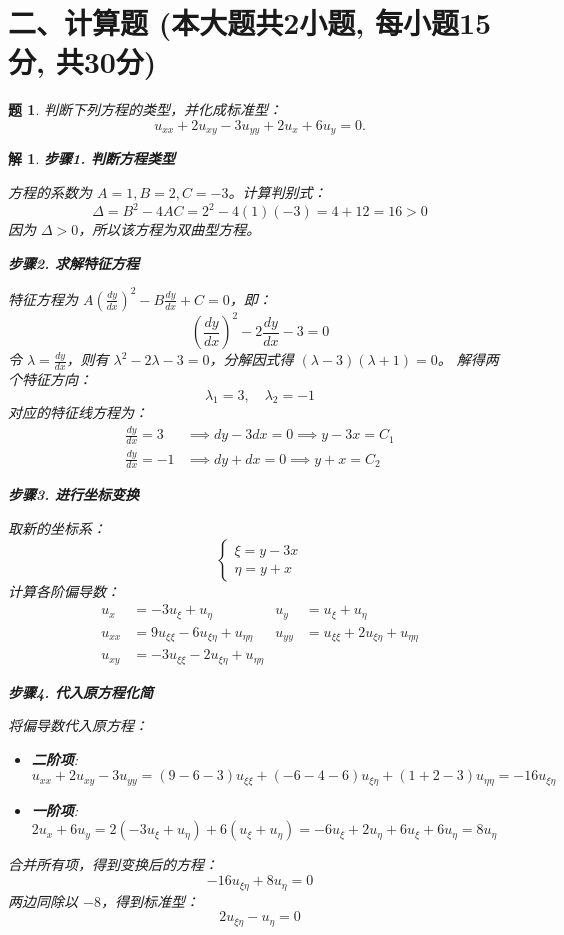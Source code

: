 \documentclass[12pt,a4paper]{article}
\newtheorem{problem}{题}
\newtheorem*{solution}{解}
\begin{document}
	\newpage
	\section*{二、计算题 (本大题共2小题, 每小题15分, 共30分)}
	
	\begin{problem}
		判断下列方程的类型，并化成标准型：
		\[
		u_{xx} + 2u_{xy} - 3u_{yy} + 2u_x + 6u_y = 0.
		\]
	\end{problem}
	\hrulefill
	\begin{solution}
		\textbf{步骤1. 判断方程类型}
		
		\noindent
		方程的系数为 $A=1, B=2, C=-3$。计算判别式：
		\[
		\Delta = B^2 - 4AC = 2^2 - 4(1)(-3) = 4 + 12 = 16 > 0
		\]
		因为 $\Delta > 0$，所以该方程为双曲型方程。
		
		\hrulefill
		
		\textbf{步骤2. 求解特征方程}
		
		\noindent
		特征方程为 $A \left(\frac{dy}{dx}\right)^2 - B \frac{dy}{dx} + C = 0$，即：
		\[
		\left(\frac{dy}{dx}\right)^2 - 2\frac{dy}{dx} - 3 = 0
		\]
		令 $\lambda = \frac{dy}{dx}$，则有 $\lambda^2 - 2\lambda - 3 = 0$，分解因式得 $(\lambda - 3)(\lambda + 1) = 0$。
		解得两个特征方向：
		\[
		\lambda_1 = 3, \quad \lambda_2 = -1
		\]
		对应的特征线方程为：
		\begin{align*}
			\frac{dy}{dx} = 3 &\implies dy - 3dx = 0 \implies y - 3x = C_1 \\
			\frac{dy}{dx} = -1 &\implies dy + dx = 0 \implies y + x = C_2
		\end{align*}
		
		\hrulefill
		
		\textbf{步骤3. 进行坐标变换}
		
		\noindent
		取新的坐标系：
		\[
		\begin{cases}
			\xi = y - 3x \\
			\eta = y + x
		\end{cases}
		\]
		计算各阶偏导数：
		\begin{align*}
			u_x &= -3u_\xi + u_\eta & u_y &= u_\xi + u_\eta \\
			u_{xx} &= 9u_{\xi\xi} - 6u_{\xi\eta} + u_{\eta\eta} & u_{yy} &= u_{\xi\xi} + 2u_{\xi\eta} + u_{\eta\eta} \\
			u_{xy} &= -3u_{\xi\xi} - 2u_{\xi\eta} + u_{\eta\eta}
		\end{align*}
		
		\hrulefill
		
		\textbf{步骤4. 代入原方程化简}
		
		\noindent
		将偏导数代入原方程：
		\begin{itemize}
			\item \textbf{二阶项}:
			$u_{xx} + 2u_{xy} - 3u_{yy} = (9-6-3)u_{\xi\xi} + (-6-4-6)u_{\xi\eta} + (1+2-3)u_{\eta\eta} = -16u_{\xi\eta}$
			\item \textbf{一阶项}:
			$2u_x + 6u_y = 2(-3u_\xi + u_\eta) + 6(u_\xi + u_\eta) = -6u_\xi + 2u_\eta + 6u_\xi + 6u_\eta = 8u_\eta$
		\end{itemize}
		合并所有项，得到变换后的方程：
		\[ -16u_{\xi\eta} + 8u_\eta = 0 \]
		两边同除以 $-8$，得到标准型：
		\[ 2u_{\xi\eta} - u_\eta = 0 \]
	\end{solution}
\end{document}

